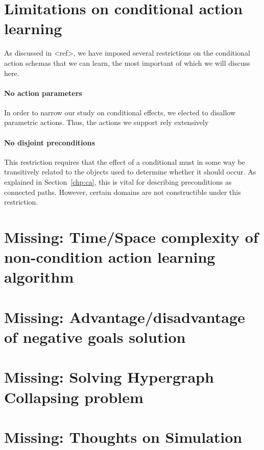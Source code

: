 \documentclass[Master.tex]{subfiles}
\begin{document}
\section{Limitations on conditional action learning}
As discussed in <ref>, we have imposed several restrictions on the conditional action schemas that we can learn, the most important of which we will discuss here.

\paragraph*{No action parameters}
In order to narrow our study on conditional effects, we elected to disallow parametric actions. Thus, the actions we support rely extensively 


\paragraph{No disjoint preconditions}
This restriction requires that the effect of a conditional must in some way be transitively related to the objects used to determine whether it should occur. As explained in Section~\ref{chp:ca}, this is vital for describing preconditions as connected paths. However, certain domains are not constructible under this restriction. 


\section{Missing: Time/Space complexity of non-condition action learning algorithm}

\section{Missing: Advantage/disadvantage of negative goals solution}

\section{Missing: Solving Hypergraph Collapsing problem}

\section{Missing: Thoughts on Simulation}

%    
%
%    
%
%    
\end{document}
